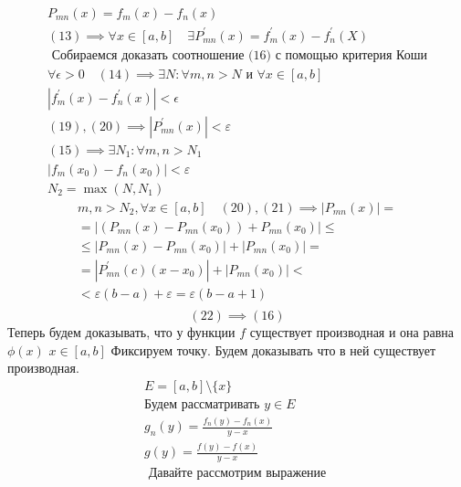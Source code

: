 \documentclass[main]{subfiles}
\begin{document}
\begin{longProof}
     \begin{gather*}
          P_{mn}(x) = f_m(x) - f_n(x)   \\
          (13) \implies \forall x \in [a,b] \quad \exists P^\prime_{mn}(x)  = f^\prime_m(x) - f^\prime_n(X) \tag{19} \\
          \text{ Собираемся доказать соотношение (16) с помощью критерия Коши}  \\
          \forall \epsilon > 0 \quad (14) \implies \exists N : \forall m, n > N \text{ и } \forall x \in [a,b] \\
          |f^\prime_m(x) - f^\prime_n(x) | < \epsilon \tag{20} \\
          (19),(20) \implies |P^\prime_{mn}(x) | < \varepsilon \tag{20\prime} \\
          (15) \implies \exists N_1: \forall m, n > N_1 \\
          |f_m(x_0) - f_n(x_0)| < \varepsilon \tag{21} \\
          N_2 = \max(N,N_1) 
     \end{gather*}
          \begin{multline*}
          m, n > N_2, \forall x \in [a,b] \quad (20), (21) \implies |P_{mn}(x) | = \\
          =|(P_{mn}(x) - P_{mn}(x_0)) + P_{mn}(x_0) | \leq \\
           \leq |P_{mn}(x) - P_{mn}(x_0) | + |P_{mn}(x_0)| = \\
          =|P^\prime_{mn} (c)(x-x_0) | + |P_{mn}(x_0)| < \\ <
          \varepsilon(b-a) + \varepsilon = \varepsilon(b-a+1) \tag{22} \\\end{multline*}
          \[ (22) \implies (16) \]
     Теперь будем доказывать, что у функции $f$ существует производная и она равна $\phi(x)$
          $x \in [a,b]$ Фиксируем точку. Будем доказывать что в ней существует производная.
          \begin{gather*}
          E = [a,b] \setminus \{ x \} \\
          \text{Будем рассматривать } y \in E \\
          g_n(y) = \frac{f_n(y) - f_n(x)}{y-x} \tag{23} \\
          g(y) = \frac{f(y)-f(x)}{y-x} \tag{24} \\
          \text{ Давайте рассмотрим выражение }  \end{gather*}
          \begin{multline*}

\end{multline*}
\end{longProof}
\end{document}
